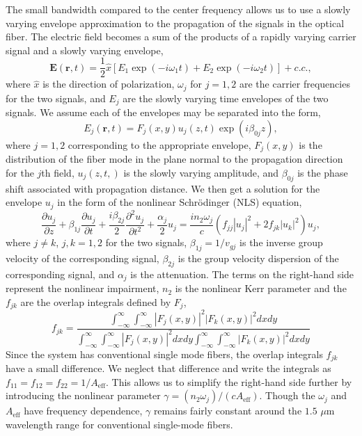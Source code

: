 The small bandwidth compared to the center frequency allows us to use a slowly varying envelope approximation to the propagation of the signals in the optical fiber. The electric field becomes a sum of the products of a rapidly varying carrier signal and a slowly varying envelope,
%
\begin{equation}
\mathbf{E}(\mathbf{r}, t) = \frac{1}{2}\hat{x}\left[ E_1\exp(-i\omega_1t) + E_2\exp(-i\omega_2t)\right] + c.c.,
\end{equation}
%
where $\hat{x}$ is the direction of polarization, $\omega_j$ for $j=1,2$ are the carrier frequencies for the two signals, and $E_j$ are the slowly varying time envelopes of the two signals. We assume each of the envelopes may be separated into the form,
%
\begin{equation}
E_j(\mathbf{r}, t) = F_j(x,y)u_j(z,t)\exp(i\beta_{0j}z),
\end{equation}
%
where $j=1,2$ corresponding to the appropriate envelope, $F_j(x,y)$ is the distribution of the fiber mode in the plane normal to the propagation direction for the $j$th field, $u_j(z,t,)$ is the slowly varying amplitude, and $\beta_{0j}$ is the phase shift associated with propagation distance. We then get a solution for the envelope $u_j$ in the form of the nonlinear Schr{\"o}dinger (NLS) equation,
%
\begin{equation}
\frac{\partial u_j}{\partial z} + \beta_{1j}\frac{\partial u_j}{\partial t} + \frac{i\beta_{2j}}{2}\frac{\partial^2 u_j}{\partial t^2} + \frac{\alpha_j}{2}u_j = \frac{in_2\omega_j}{c}\left(f_{jj}|u_j|^2 + 2f_{jk}|u_k|^2\right)u_j,
\end{equation}
%
where $j\neq k$, $j,k = 1,2$ for the two signals, $\beta_{1j} = 1/v_{gj}$ is the inverse group velocity of the corresponding signal, $\beta_{2j}$ is the group velocity dispersion of the corresponding signal, and $\alpha_j$ is the attenuation. The terms on the right-hand side represent the nonlinear impairment, $n_2$ is the nonlinear Kerr parameter and the $f_{jk}$ are the overlap integrals defined by $F_j$,
%
\begin{equation}
f_{jk} = \frac{\int_{-\infty}^{\infty}\int_{-\infty}^{\infty} |F_j(x,y)|^2|F_k(x,y)|^2dxdy }{\int_{-\infty}^{\infty}\int_{-\infty}^{\infty} |F_j(x,y)|^2dxdy\int_{-\infty}^{\infty}\int_{-\infty}^{\infty}|F_k(x,y)|^2dxdy}
\end{equation}
%
Since the system has conventional single mode fibers, the overlap integrals $f_{jk}$ have a small difference. We neglect that difference and write the integrals as $f_{11} = f_{12} = f_{22} = 1/A_{\text{eff}}$. This allows us to simplify the right-hand side further by introducing the nonlinear parameter $\gamma = (n_2\omega_j)/(cA_{\text{eff}})$. Though the $\omega_j$ and $A_{\text{eff}}$ have frequency dependence, $\gamma$ remains fairly constant around the $1.5$ $\mu$m wavelength range for conventional single-mode fibers.

